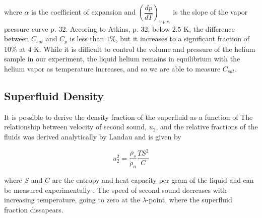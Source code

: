 where $\alpha$ is the coefficient of expansion and
$\left(\dfrac{dp}{dT}\right)_{v.p.c.}$ is the slope of the vapor
pressure curve \cite{atkins} p. 32. Accoring to Atkins, p. 32, below
$2.5$ K, the difference between $C_{sat}$ and $C_p$ is less than
$1\%$, but it increases to a significant fraction of $10\%$ at $4$
K. While it is difficult to control the volume and pressure of the
helium sample in our experiment, the liquid helium remains in
equilibrium with the helium vapor as temperature increases, and so we
are able to measure $C_{sat}$.

\subsection{Superfluid Density}

It is possible to derive the density fraction of the superfluid as a
function of The relationship between velocity of second sound, $u_2$,
and the relative fractions of the fluids was derived analytically by
Landau and is given by

\begin{equation}
u_2^2 = \frac{\rho_s}{\rho_n}\frac{T S^2}{C}
\end{equation}

where $S$ and $C$ are the entropy and heat capacity per gram of the
liquid and can be measured experimentally \cite{atkins}. The
speed of second sound decreases with increasing temperature, going
to zero at the $\lambda$-point, where the superfluid fraction
dissapears.